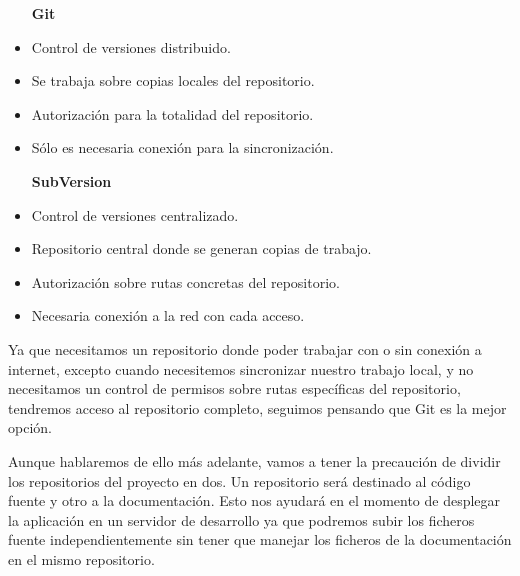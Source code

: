 \begin{itemize}
\item [\textbf{Git}]
\item Control de versiones distribuido.
\item Se trabaja sobre copias locales del repositorio.
\item Autorización para la totalidad del repositorio.
\item Sólo es necesaria conexión para la sincronización.
\item [\textbf{SubVersion}]
\item Control de versiones centralizado.
\item Repositorio central donde se generan copias de trabajo.
\item Autorización sobre rutas concretas del repositorio.
\item Necesaria conexión a la red con cada acceso.
\end{itemize}


Ya que necesitamos un repositorio donde poder trabajar con o sin conexión a internet, excepto cuando necesitemos sincronizar nuestro trabajo local, y no necesitamos un control de permisos sobre rutas específicas del repositorio, tendremos acceso al repositorio completo, seguimos pensando que Git es la mejor opción.

\bigskip
Aunque hablaremos de ello más adelante, vamos a tener la precaución de dividir los repositorios del proyecto en dos. Un repositorio será destinado al código fuente y otro a la documentación. Esto nos ayudará en el momento de desplegar la aplicación en un servidor de desarrollo ya que podremos subir los ficheros fuente independientemente sin tener que manejar los ficheros de la documentación en el mismo repositorio.




